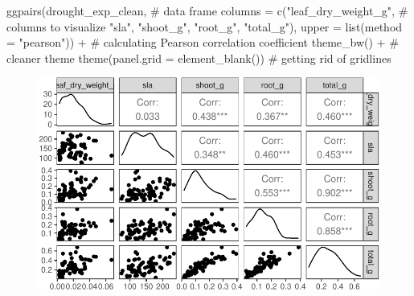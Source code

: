 \documentclass[
  letterpaper,
  DIV=11,
  numbers=noendperiod]{scrartcl}
\newenvironment{Shaded}{\begin{snugshade}}{\end{snugshade}}
\newcommand{\AttributeTok}[1]{\textcolor[rgb]{0.40,0.45,0.13}{#1}}
\newcommand{\CommentTok}[1]{\textcolor[rgb]{0.37,0.37,0.37}{#1}}
\newcommand{\FunctionTok}[1]{\textcolor[rgb]{0.28,0.35,0.67}{#1}}
\newcommand{\NormalTok}[1]{\textcolor[rgb]{0.00,0.23,0.31}{#1}}
\newcommand{\SpecialCharTok}[1]{\textcolor[rgb]{0.37,0.37,0.37}{#1}}
\newcommand{\StringTok}[1]{\textcolor[rgb]{0.13,0.47,0.30}{#1}}
\begin{document}
\begin{Shaded}
\begin{Highlighting}[]
\FunctionTok{ggpairs}\NormalTok{(drought\_exp\_clean, }\CommentTok{\# data frame}
        \AttributeTok{columns =} \FunctionTok{c}\NormalTok{(}\StringTok{"leaf\_dry\_weight\_g"}\NormalTok{, }\CommentTok{\# columns to visualize}
                    \StringTok{"sla"}\NormalTok{, }
                    \StringTok{"shoot\_g"}\NormalTok{, }
                    \StringTok{"root\_g"}\NormalTok{, }
                    \StringTok{"total\_g"}\NormalTok{), }
        \AttributeTok{upper =} \FunctionTok{list}\NormalTok{(}\AttributeTok{method =} \StringTok{"pearson"}\NormalTok{)) }\SpecialCharTok{+} \CommentTok{\# calculating Pearson correlation coefficient}
  \FunctionTok{theme\_bw}\NormalTok{() }\SpecialCharTok{+} \CommentTok{\# cleaner theme}
  \FunctionTok{theme}\NormalTok{(}\AttributeTok{panel.grid =} \FunctionTok{element\_blank}\NormalTok{()) }\CommentTok{\# getting rid of gridlines}
\end{Highlighting}
\end{Shaded}

\begin{figure}[H]

{\centering \includegraphics{Odile_Gabbiani_homework-03_files/figure-pdf/unnamed-chunk-3-1.pdf}

}

\end{figure}
\end{document}
